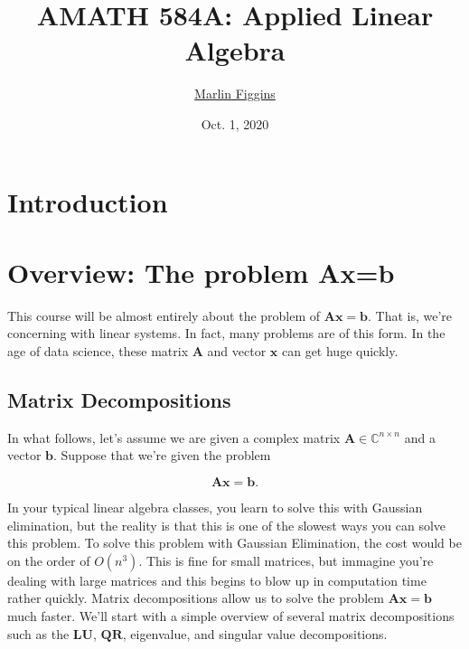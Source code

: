 \documentclass[12pt]{article}
\title{\bfseries\huge{AMATH 584A: Applied Linear Algebra}\vspace{-1ex}} \author{\href{marlinfiggins@gmail.com}{\Large{Marlin Figgins}}\vspace{-2ex}}
\date{\large{Oct. 1, 2020}}
\newcommand{\bbC}{\mathbb{C}}
\renewcommand{\vec}[1]{\mathbf{#1}}
\theoremstyle{definition}
\theoremstyle{remark}
\numberwithin{equation}{section}
\begin{document}
\maketitle

	\section*{\hfill Introduction \hfill}

  \thispagestyle{empty}

  \newpage
  \tableofcontents
  \thispagestyle{empty}
  \newpage

  \setcounter{page}{1}


  \section{Overview: The problem Ax=b}
  This course will be almost entirely about the problem of $\vec{Ax}=\vec{b}$. That is, we're concerning with linear systems. In fact, many problems are of this form. In the age of data science, these matrix $\vec{A}$ and vector $\vec{x}$ can get huge quickly. 
  
  \subsection{Matrix Decompositions}%
  \label{sub:matrix_decompositions}

  In what follows, let's assume we are given a complex matrix $\vec{A}\in \bbC^{n \times n}$ and a vector $\vec{b}$. Suppose that we're given the problem
  
  \begin{equation}
    \vec{Ax} = \vec{b}.
  \end{equation}

In your typical linear algebra classes, you learn to solve this with Gaussian elimination, but the reality is that this is one of the slowest ways you can solve this problem. To solve this problem with Gaussian Elimination, the cost would be on the order of $O(n^3)$. This is fine for small matrices, but immagine you're dealing with large matrices and this begins to blow up in computation time rather quickly. Matrix decompositions allow us to solve the problem $\vec{Ax} = \vec{b}$ much faster. We'll start with a simple overview of several matrix decompositions such as the $\vec{LU}$, $\vec{QR}$, eigenvalue, and singular value decompositions.
\end{document}
